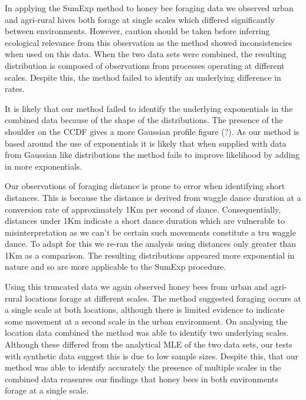 \documentclass[11pt,usenames,dvipsnames]{article}
\begin{document}
In applying the SumExp method to honey bee foraging data we observed urban and agri-rural hives both forage at single scales which differed significantly between environments. However, caution should be taken before inferring ecological relevance from this observation as the method showed inconsistencies when used on this data. When the two data sets were combined, the resulting distribution is composed of observations from processes operating at different scales. Despite this, the method failed to identify an underlying difference in rates. 

It is likely that our method failed to identify the underlying exponentials in the combined data because of the shape of the distributions. The presence of the shoulder on the CCDF gives a more Gaussian profile figure (?). As our method is based around the use of exponentials it is likely that when supplied with data from Gaussian like distributions the method fails to improve likelihood by adding in more exponentials.

Our observations of foraging distance is prone to error when identifying short distances. This is because the distance is derived from waggle dance duration at a conversion rate of approximately 1Km per second of dance. Consequentially, distances under 1Km indicate a short dance duration which are vulnerable to misinterpretation as we can't be certain such movements constitute a tru waggle dance. To adapt for this we re-ran the analysis using distances only greater than 1Km as a comparison. The resulting distributions appeared more exponential in nature and so are more applicable to the SumExp procedure.

Using this truncated data we again observed honey bees from urban and agri-rural locations forage at different scales. The method suggested foraging occurs at a single scale at both locations, although there is limited evidence to indicate some movement at a second scale in the urban environment. On analysing the location data combined the method was able to identify two underlying scales. Although these differed from the analytical MLE of the two data sets, our tests with synthetic data suggest this is due to low sample sizes. Despite this, that our method was able to identify accurately the presence of multiple scales in the combined data reassures our findings that honey bees in both environments forage at a single scale. 
\end{document}
